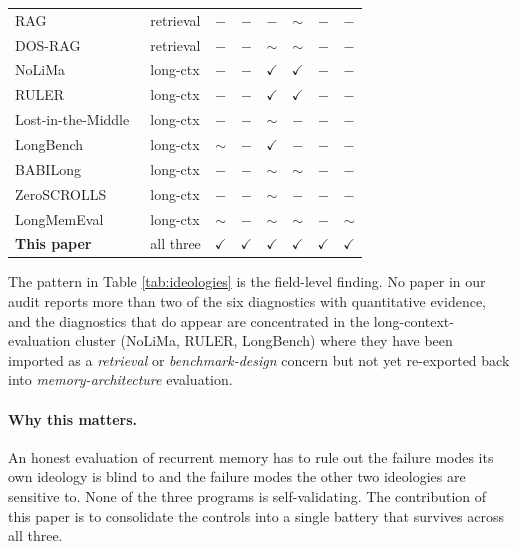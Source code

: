 \documentclass{article}
\begin{document}
\begin{table}[t]
\begin{tabular}{llcccccc}
RAG~\cite{ragoriginal2020}                         & retrieval & $-$    & $-$    & $-$           & $\sim$        & $-$ & $-$    \\
DOS-RAG~\cite{ragbaseline2025}                     & retrieval & $-$    & $-$    & $\sim$        & $\sim$        & $-$ & $-$    \\
NoLiMa~\cite{nolima2025}                           & long-ctx  & $-$    & $-$    & $\checkmark$  & $\checkmark$  & $-$ & $-$    \\
RULER~\cite{ruler2024}                             & long-ctx  & $-$    & $-$    & $\checkmark$  & $\checkmark$  & $-$ & $-$    \\
Lost-in-the-Middle~\cite{lostmiddle2024}           & long-ctx  & $-$    & $-$    & $\sim$        & $-$           & $-$ & $-$    \\
LongBench~\cite{longbench2024}                     & long-ctx  & $\sim$ & $-$    & $\checkmark$  & $-$           & $-$ & $-$    \\
BABILong~\cite{babilong2024}                       & long-ctx  & $-$    & $-$    & $\sim$        & $\sim$        & $-$ & $-$    \\
ZeroSCROLLS~\cite{zeroscrolls2023}                 & long-ctx  & $-$    & $-$    & $\sim$        & $-$           & $-$ & $-$    \\
LongMemEval~\cite{longmemeval2025}                 & long-ctx  & $\sim$ & $-$    & $\sim$        & $\sim$        & $-$ & $\sim$ \\
\textbf{This paper}                                & all three & $\checkmark$ & $\checkmark$ & $\checkmark$ & $\checkmark$ & $\checkmark$ & $\checkmark$ \\
\bottomrule
\end{tabular}
\end{table}

The pattern in Table \ref{tab:ideologies} is the field-level
finding.  No paper in our audit reports more than two of the six
diagnostics with quantitative evidence, and the diagnostics that do
appear are concentrated in the long-context-evaluation cluster
(NoLiMa, RULER, LongBench) where they have been imported as a
\emph{retrieval} or \emph{benchmark-design} concern but not yet
re-exported back into \emph{memory-architecture} evaluation.

\paragraph{Why this matters.}  An honest evaluation of recurrent
memory has to rule out the failure modes its own ideology is blind to
and the failure modes the other two ideologies are sensitive to.
None of the three programs is self-validating.  The contribution of
this paper is to consolidate the controls into a single battery
that survives across all three.
\end{document}
